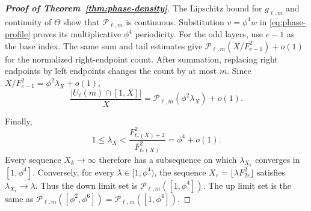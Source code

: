 \documentclass[10pt,a4paper]{amsart}
\begin{document}
\begin{proof}[\bf Proof of Theorem~\ref{thm:phase-density}]
The Lipschitz bound for $g_{\ell,m}$ and continuity of $\Theta$ show
that $\mathcal P_{\ell,m}$ is continuous. Substitution $v=\phi^4w$ in
\eqref{eq:phase-profile} proves its multiplicative $\phi^4$ periodicity.
For the odd layers, use $e-1$ as the base index. The same sum and tail
estimates give $\mathcal P_{\ell,m}(X/F_{e-1}^2)+o(1)$ for the
normalized right-endpoint count. After summation, replacing right
endpoints by left endpoints changes the count by at most $m$. Since
$X/F_{e-1}^2=\phi^2\lambda_X+o(1)$,
\[
 \frac{|U_\ell(m)\cap[1,X]|}{X}
 =\mathcal P_{\ell,m}(\phi^2\lambda_X)+o(1).
\]

Finally,
\[
 1\leq\lambda_X<
 \frac{F_{t_*(X)+2}^2}{F_{t_*(X)}^2}=\phi^4+o(1).
\]
Every sequence $X_k\to\infty$ therefore has a subsequence on which
$\lambda_{X_k}$ converges in $[1,\phi^4]$. Conversely, for every
$\lambda\in[1,\phi^4)$, the sequence
$X_r=\lfloor\lambda F_{2r}^2\rfloor$ satisfies
$\lambda_{X_r}\to\lambda$. Thus the down limit set is
$\mathcal P_{\ell,m}([1,\phi^4])$. The up limit set is the same as
$\mathcal P_{\ell,m}([\phi^2,\phi^6])
=\mathcal P_{\ell,m}([1,\phi^4])$.
\end{proof}
\end{document}
